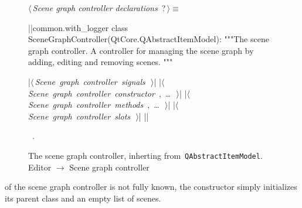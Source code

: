 \documentclass[%
    a4paper,    %
    justified,  %
    nobib,      %
    openany     %
]{tufte-book}
\begin{document}
\begin{figure}
\begin{flushleft} \small
\begin{minipage}{\linewidth}\label{scrap25}\raggedright\small
{} $\langle\,${\itshape Scene graph controller declarations}\nobreak\ {\footnotesize {?}}$\,\rangle\equiv$
\vspace{-1ex}
\begin{pythoncode}
|\normalfont{}\fontfamily{}|common.with_logger
class SceneGraphController(QtCore.QAbstractItemModel):
    """The scene graph controller.
    A controller for managing the scene graph by adding,
    editing and removing scenes.
    """

    |\hbox{$\langle\,${\itshape Scene graph controller signals}\nobreak\ {\footnotesize {}}$\,\rangle$}|
    |\hbox{$\langle\,${\itshape Scene graph controller constructor}\nobreak\ {\footnotesize {}, \ldots\ }$\,\rangle$}|
    |\hbox{$\langle\,${\itshape Scene graph controller methods}\nobreak\ {\footnotesize {}, \ldots\ }$\,\rangle$}|
    |\hbox{$\langle\,${\itshape Scene graph controller slots}\nobreak\ {\footnotesize {}}$\,\rangle$}|
|\NWsep|
\end{pythoncode}
\vspace{1.5ex}
\footnotesize
\begin{list}{}{\setlength{\itemsep}{-\parsep}\setlength{\itemindent}{-\leftmargin}}
\item \NWtxtMacroRefIn\ .

\item{}
\end{list}
\end{minipage}\vspace{4ex}
\end{flushleft}
\caption{The scene graph controller, inherting from~\texttt{QAbstractItemModel}.
  \newline{}\newline{}Editor $\rightarrow$ Scene graph controller}
\label{editor:lst:scene-graph-controller}
\end{figure}

 of the scene graph controller is
not fully known, the constructor simply initializes its parent class and an
empty list of scenes.
\end{document}
